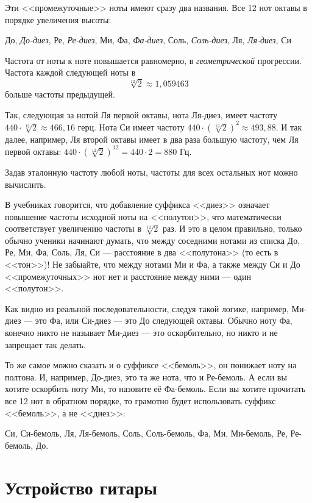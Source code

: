 Эти <<промежуточные>> ноты имеют сразу два названия. Все 12 нот октавы в порядке увеличения высоты:
\begin{center}
    До, \emph{До-диез}, Ре, \emph{Ре-диез}, Ми, Фа, \emph{Фа-диез}, Соль, \emph{Соль-диез}, Ля, \emph{Ля-диез}, Си
\end{center}

Частота от ноты к ноте повышается равномерно, в \emph{геометрической} прогрессии. Частота каждой следующей ноты в \[\sqrt[12]{2}\approx 1,059463\] больше частоты предыдущей. 

Так, следующая за нотой Ля первой октавы, нота Ля-диез, имеет частоту $440\cdot\sqrt[12]{2}\approx 466,16$ герц. Нота Си имеет частоту $440\cdot(\sqrt[12]{2})^2\approx 493,88$. И так далее, например, Ля второй октавы имеет в два раза большую частоту, чем Ля первой октавы: $440\cdot(\sqrt[12]{2})^{12}=440\cdot 2=880$ Гц.

Задав эталонную частоту любой ноты, частоты для всех остальных нот можно вычислить.

В учебниках говорится, что добавление суффикса <<диез>> означает повышение частоты исходной ноты на <<полутон>>, что математически соответствует увеличению частоты в $\sqrt[12]{2}$ раз. И это в целом правильно, только обычно ученики начинают думать, что между соседними нотами из списка До, Ре, Ми, Фа, Соль, Ля, Си --- расстояние в два <<полутона>> (то есть в <<тон>>)! Не забыайте, что между нотами Ми и Фа, а также между Си и До <<промежуточных>> нот нет и расстояние между ними --- один <<полутон>>. 

Как видно из реальной последовательности, следуя такой логике, например, Ми-диез --- это Фа, или Си-диез --- это До следующей октавы. Обычно ноту Фа, конечно никто не называет Ми-диез --- это оскорбительно, но никто и не запрещает так делать. 

То же самое можно сказать и о суффиксе <<бемоль>>, он понижает ноту на полтона. И, например, До-диез, это та же нота, что и Ре-бемоль. А если вы хотите оскорбить ноту Ми, то назовите её Фа-бемоль. Если вы хотите прочитать все 12 нот в обратном порядке, то грамотно будет использовать суффикс <<бемоль>>, а не <<диез>>:

\begin{center}
Си, Си-бемоль, Ля, Ля-бемоль, Соль, Соль-бемоль, Фа, Ми, Ми-бемоль, Ре, Ре-бемоль, До.
\end{center}


\section{Устройство гитары}

